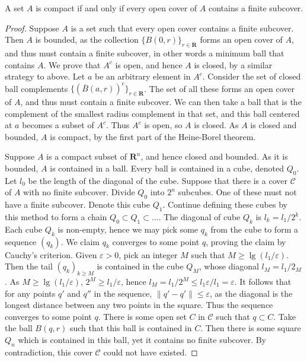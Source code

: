 \begin{theorem}
  A set $A$ is compact if and only if every open cover of $A$ contains a finite subcover.
\end{theorem}
\begin{proof}
  Suppose $A$ is a set such that every open cover contains a finite subcover. Then $A$ is bounded, as the collection $\{B(0,r)\}_{r \in \mathbf{R}}$ forms an open cover of $A$, and thus must contain a finite subcover, in other words a minimum ball that contains $A$. We prove that $A^c$ is open, and hence $A$ is closed, by a similar strategy to above. Let $a$ be an arbitrary element in $A^c$. Consider the set of closed ball complements $\{(\overline{B}(a,r))^c\}_{r \in \mathbf{R}}$. The set of all these forms an open cover of $A$, and thus must contain a finite subcover. We can then take a ball that is the complement of the smallest radius complement in that set, and this ball centered at $a$ becomes a subset of $A^c$. Thus $A^c$ is open, so $A$ is closed. As $A$ is closed and bounded, $A$ is compact, by the first part of the Heine-Borel theorem.

  Suppose $A$ is a compact subset of $\mathbf{R}^n$, and hence closed and bounded. As it is bounded, $A$ is contained in a ball. Every ball is contained in a cube, denoted $Q_0$. Let $l_0$ be the length of the diagonal of the cube. Suppose that there is a cover $\mathcal{C}$ of $A$ with no finite subcover. Divide $Q_0$ into $2^n$ subcubes. One of these must not have a finite subcover. Denote this cube $Q_1$. Continue defining these cubes by this method to form a chain $Q_0 \subset Q_1 \subset \dots$. The diagonal of cube $Q_k$ is $l_k = l_1/2^k$. Each cube $Q_k$ is non-empty, hence we may pick some $q_k$ from the cube to form a sequence $(q_k)$. We claim $q_k$ converges to some point $q$, proving the claim by Cauchy's criterion. Given $\varepsilon > 0$, pick an integer $M$ such that $M \geq \lg(l_1/\varepsilon)$. Then the tail $(q_k)_{k \geq M}$ is contained in the cube $Q_M$, whose diagonal $l_M = l_1/2_M$. As $M \geq \lg(l_1/\varepsilon)$, $2^M \geq l_1/\varepsilon$, hence $l_M = l_1/2^M \leq l_1 \varepsilon/l_1 = \varepsilon$. It follows that for any points $q'$ and $q''$ in the sequence, $\| q' - q' \| \leq \varepsilon$, as the diagonal is the longest distance between any two points in the square. Thus the sequence converges to some point $q$. There is some open set $C$ in $\mathcal{C}$ such that $q \subset C$. Take the ball $B(q,r)$ such that this ball is contained in $C$. Then there is some square $Q_n$ which is contained in this ball, yet it contains no finite subcover. By contradiction, this cover $\mathcal{C}$ could not have existed.
\end{proof}

